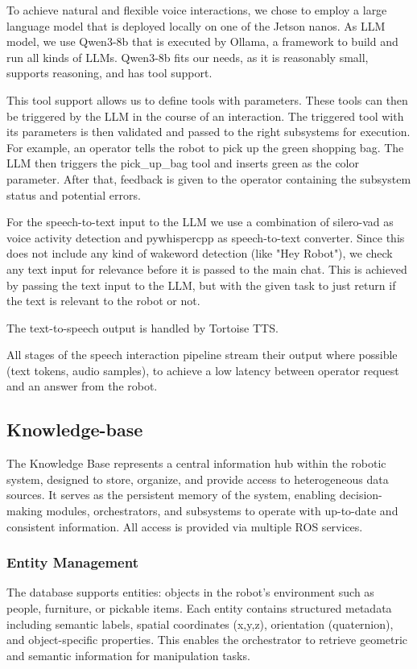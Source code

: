 To achieve natural and flexible voice interactions, we chose to employ a large language model that is deployed locally on one of the Jetson nanos.
As LLM model, we use Qwen3-8b\cite{qwen3} that is executed by Ollama\cite{Ollama}, a framework to build and run all kinds of LLMs. Qwen3-8b fits our needs, as it is reasonably small, supports reasoning, and has tool support.

This tool support allows us to define tools with parameters. These tools can then be triggered by the LLM in the course of an interaction. The triggered tool with its parameters is then validated and passed to the right subsystems for execution.
For example, an operator tells the robot to pick up the green shopping bag. The LLM then triggers the pick\_up\_bag tool and inserts green as the color parameter. After that, feedback is given to the operator containing the subsystem status and potential errors.

For the speech-to-text input to the LLM we use a combination of silero-vad\cite{Silero_Team_Silero_VAD_pre-trained_2024} as voice activity detection and pywhispercpp\cite{pywhispercpp} as speech-to-text converter. Since this does not include any kind of wakeword detection (like "Hey Robot"),
we check any text input for relevance before it is passed to the main chat. This is achieved by passing the text input to the LLM, but with the given task to just return if the text is relevant to the robot or not.

The text-to-speech output is handled by Tortoise TTS\cite{Betker_TorToiSe_text-to-speech_2022}.

All stages of the speech interaction pipeline stream their output where possible (text tokens, audio samples), to achieve a low latency between operator request and an answer from the robot.

\subsection{Knowledge-base}
The Knowledge Base represents a central information hub within the robotic system, designed to store, organize, and provide access to heterogeneous data sources. It serves as the persistent memory of the system, enabling decision-making modules, orchestrators, and subsystems to operate with up-to-date and consistent information.
All access is provided via multiple ROS services.

\subsubsection{Entity Management}
The database supports entities: objects in the robot's environment such as people, furniture, or pickable items. Each entity contains structured metadata including semantic labels, spatial coordinates (x,y,z), orientation (quaternion), and object-specific properties. This enables the orchestrator to retrieve geometric and semantic information for manipulation tasks.

